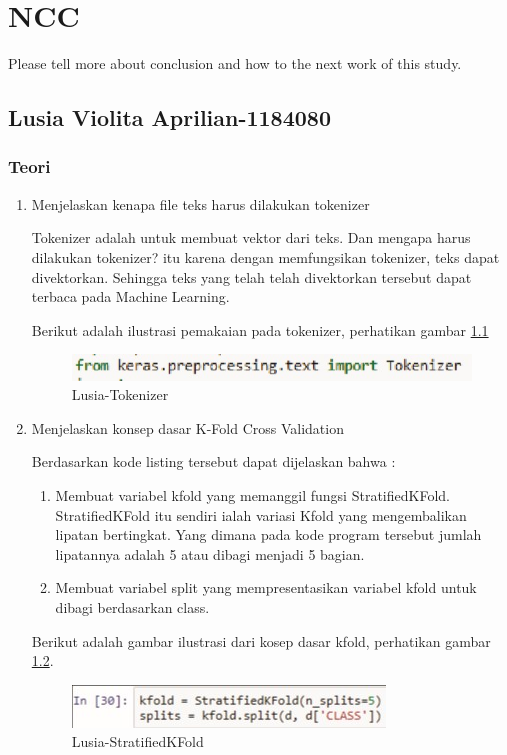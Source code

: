 \chapter{NCC}
Please tell more about conclusion and how to the next work of this study.

\section{Lusia Violita Aprilian-1184080}
\subsection{Teori}
\begin{enumerate}
\item Menjelaskan kenapa file teks harus dilakukan tokenizer
	\par Tokenizer adalah untuk membuat vektor dari teks. Dan mengapa harus dilakukan tokenizer? itu karena dengan memfungsikan tokenizer, teks dapat divektorkan. Sehingga teks yang telah telah divektorkan tersebut dapat terbaca pada Machine Learning.
	\par Berikut adalah ilustrasi pemakaian pada tokenizer, perhatikan gambar \ref{7A1}
		\begin{figure}[!hbtp]
		\centering
		\includegraphics[scale=0.4]{figures/v1.jpg}
		\caption{Lusia-Tokenizer}
		\label{7A1}
		\end{figure}

\item Menjelaskan konsep dasar K-Fold Cross Validation
	
	\par Berdasarkan kode listing tersebut dapat dijelaskan bahwa :
	\begin{enumerate}
	\item Membuat variabel kfold yang memanggil fungsi StratifiedKFold. StratifiedKFold itu sendiri ialah variasi Kfold yang mengembalikan lipatan bertingkat. Yang dimana pada kode program tersebut jumlah lipatannya adalah 5 atau dibagi menjadi 5 bagian.
	\item Membuat variabel split yang mempresentasikan variabel kfold untuk dibagi berdasarkan class.
	\end{enumerate}
	
	\par Berikut adalah gambar ilustrasi dari kosep dasar kfold, perhatikan gambar \ref{7A2}.
		\begin{figure}[!hbtp]
		\centering
		\includegraphics[scale=0.4]{figures/v2.jpg}
		\caption{Lusia-StratifiedKFold}
		\label{7A2}
		\end{figure}


\end{enumerate}
